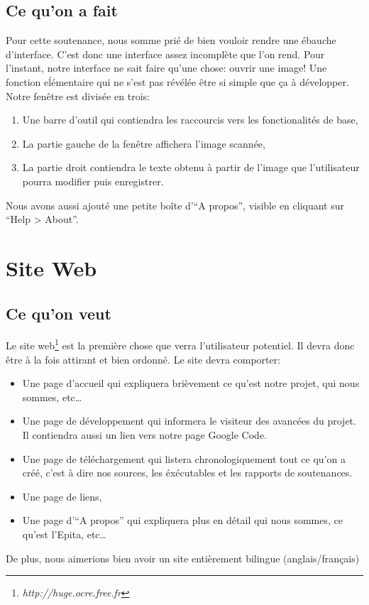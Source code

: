 \documentclass[]{report}
\begin{document}
		\section{Ce qu'on a fait} %
		\label{sec:ce_qu_on_a_fait}
			Pour cette soutenance, nous somme pri\'e de bien vouloir rendre une \'ebauche d'interface. C'est donc une interface assez incompl\`ete que l'on rend. Pour l'instant, notre interface ne sait faire qu'une chose: ouvrir une image! Une fonction e\'l\'ementaire qui ne s'est pas r\'ev\'el\'ee \^etre si simple que \c ca \`a d\'evelopper. Notre fen\^etre est divis\'ee en trois:
			\begin{enumerate}
				\item Une barre d'outil qui contiendra les raccourcis vers les fonctionalit\'es de base,
				\item La partie gauche de la fen\^etre affichera l'image scann\'ee,
				\item La partie droit contiendra le texte obtenu \`a partir de l'image que l'utilisateur pourra modifier puis enregistrer.
			\end{enumerate}
			
			Nous avons aussi ajout\'e une petite bo\^ite d'``A propos'', visible en cliquant sur ``Help > About''. 
		
		
		

	\chapter{Site Web} %
	\label{cha:site_web}
		\section{Ce qu'on veut} %
		\label{sec:ce_qu_on_veut}
		Le site web\footnote{\emph{http://huge.ocre.free.fr}} est la premi\`ere chose que verra l'utilisateur potentiel. Il devra donc \^etre \`a la fois attirant et bien ordonn\'e. Le site devra comporter:
		\begin{itemize}
			\item Une page d'accueil qui expliquera bri\`evement ce qu'est notre projet, qui nous sommes, etc\ldots
			\item Une page de d\'eveloppement qui informera le visiteur des avanc\'ees du projet. Il contiendra aussi un lien vers notre page Google Code.
			\item Une page de t\'el\'echargement qui listera chronologiquement tout ce qu'on a cr\'e\'e, c'est \`a dire nos sources, les \'ex\'ecutables et les rapports de soutenances.
			\item Une page de liens,
			\item Une page d'``A propos'' qui expliquera plus en d\'etail qui nous sommes, ce qu'est l'Epita, etc\ldots
		\end{itemize}
		De plus, nous aimerions bien avoir un site enti\`erement bilingue (anglais/fran\c cais)
\end{document}
